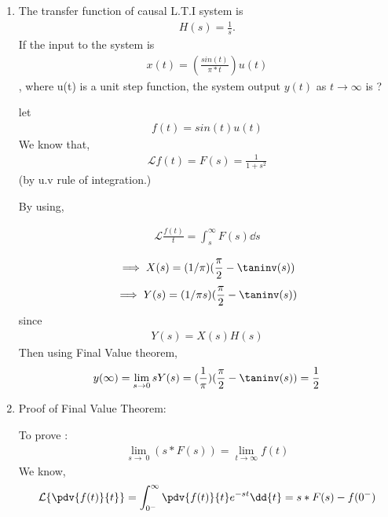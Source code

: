 \begin{enumerate}[label=\thesection.\arabic*.,ref=\thesection.\theenumi]
\item The transfer function of causal L.T.I system is 
\begin{align}
H(s) = \frac{1}{s}. 
\end{align}If the input to the system is 
\begin{align}
x(t) = (\frac{sin(t)}{\pi*t})u(t)
\end{align}
, where u(t) is a unit step function, the system output 
$y(t)$ as $t \to \infty$  is ?

\solution
let
\begin{align}
    f(t) = sin(t)u(t)
\end{align}
We know that, 
\begin{align}
\mathcal{L}{f(t)} = F(s) = \frac{1}{1 + s^2} 
\end{align}
    (by u.v rule of integration.)

By using,  

\begin{align}
  \mathcal{L}{\frac{f(t)}{t}} = \int_{s}^{\infty}F(s) \dd{s} 
\end{align}

\begin{align}
\implies X(s) = (1/ \pi)( \frac{\pi}{2} - \taninv(s))
\end{align}
\begin{align}
\implies Y(s) = (1/ \pi s) ( \frac{\pi}{2} - \taninv(s)) 
\end{align}
since 
\begin{align}
Y(s) = X(s)H(s)
\end{align}
Then using Final Value theorem,
\begin{align}
y(\infty) = \lim_{s\to 0} sY(s) =(\frac{1}{\pi}) ( \frac{\pi}{2} - \taninv(s)) = \frac{1}{2}
\end{align}





\item Proof of Final Value Theorem:

\solution
To prove : 
\begin{align}
 \lim_{s\to\ 0} (s*F(s)) = \lim_{t\to\infty} f(t)
\end{align}
We know,
\begin{align}
\mathcal{L}\{\pdv{f(t)}{t}\} = \int_{0^-}^{\infty} \pdv{f(t)}{t} e^{-st}\dd{t} =s*F(s)-f(0^{-})
\end{align}


\end{enumerate}
